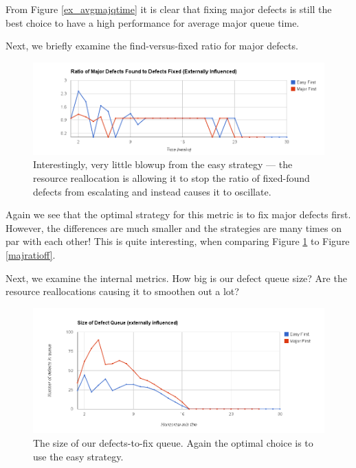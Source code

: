 From Figure \ref{ex_avgmajqtime} it is clear that fixing major defects is still the best choice to have a
high performance for average major queue time.

\pagebreak

Next, we briefly examine the find-versus-fixed ratio for major defects.

\begin{figure}[ht!]
	\centering
	\includegraphics[scale=0.45]{graphs/MajRatioFF_ex.png}
	\caption{Interestingly, very little blowup from the easy strategy --- the resource reallocation is
allowing it to stop the ratio of fixed-found defects from escalating and instead causes it to
oscillate.} 
	\label{ex_majratioff}
\end{figure}

Again we see that the optimal strategy for this metric is to fix major defects first.
However, the differences are much smaller and the strategies are many times on par with each other!
This is quite interesting, when comparing Figure \ref{ex_majratioff} to Figure \ref{majratioff}.

\pagebreak

Next, we examine the internal metrics.
How big is our defect queue size?
Are the resource reallocations causing it to smoothen out a lot?

\begin{figure}[ht!]
	\centering
	\includegraphics[scale=0.45]{graphs/QueueSz_ex.png}
	\caption{The size of our defects-to-fix queue. Again the optimal choice is to use the easy
strategy.} 
	\label{ex_qsz}
\end{figure}

